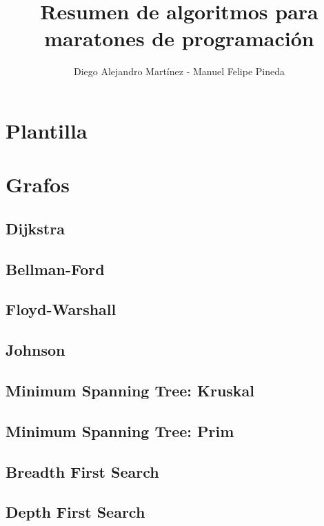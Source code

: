 \documentclass[10pt,letterpaper,twocolumn,twosided]{article}
\newcommand{\codigofuente}[1]{

\dotfill
}
\begin{document}
\title{Resumen de algoritmos para maratones de programación}
\author{Diego Alejandro Martínez - Manuel Felipe Pineda}
\maketitle

\tableofcontents
{}


\section{Plantilla}
\codigofuente{../src/template.${EXT}}

\section{Grafos}

\subsection{Dijkstra}

\subsection{Bellman-Ford}

\subsection{Floyd-Warshall}

\subsection{Johnson}

\subsection{Minimum Spanning Tree: Kruskal}

\subsection{Minimum Spanning Tree: Prim}

\subsection{Breadth First Search}

\subsection{Depth First Search}
\end{document}
